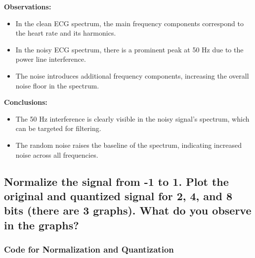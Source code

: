 \documentclass[10pt]{article}
\theoremstyle{definition}
\theoremstyle{remark}
\theoremstyle{definition}
\numberwithin{equation}{prob}
\begin{document}
\textbf{Observations:}
	\begin{itemize}
		\item In the clean ECG spectrum, the main frequency components correspond to the heart rate and its harmonics.
		\item In the noisy ECG spectrum, there is a prominent peak at 50 Hz due to the power line interference.
		\item The noise introduces additional frequency components, increasing the overall noise floor in the spectrum.
	\end{itemize}
\textbf{Conclusions:}
	\begin{itemize}
		\item The 50 Hz interference is clearly visible in the noisy signal's spectrum, which can be targeted for filtering.
		\item The random noise raises the baseline of the spectrum, indicating increased noise across all frequencies.
	\end{itemize}

\subsection{Normalize the signal from -1 to 1. Plot the original and quantized signal for 2, 4, and 8 bits (there are 3 graphs). What do you observe in the graphs?}

\subsubsection*{Code for Normalization and Quantization}
\end{document}

